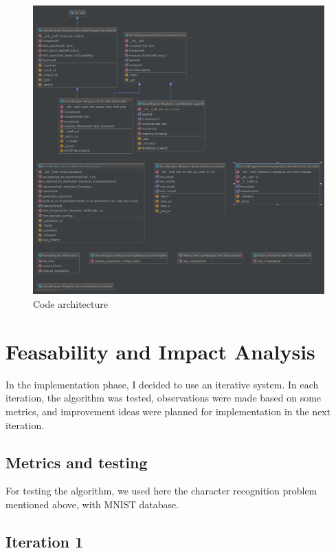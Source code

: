 \documentclass[11pt]{article}
\makeatletter
\def\maxwidth{\ifdim\Gin@nat@width>\linewidth\linewidth
    \else\Gin@nat@width\fi}
\let\Oldincludegraphics\includegraphics
\renewcommand{\includegraphics}[1]{\Oldincludegraphics[width=.8\maxwidth]{#1}}
\makeatother
\begin{document}
\begin{figure}
\centering
\includegraphics{gfx/Architecture.png}
\caption{Code architecture}
\end{figure}

    \hypertarget{feasability-and-impact-analysis}{%
\section{Feasability and Impact
Analysis}\label{feasability-and-impact-analysis}}

In the implementation phase, I decided to use an iterative system. In
each iteration, the algorithm was tested, observations were made based
on some metrics, and improvement ideas were planned for implementation
in the next iteration.

    \hypertarget{metrics-and-testing}{%
\subsection{Metrics and testing}\label{metrics-and-testing}}

For testing the algorithm, we used here the character recognition
problem mentioned above, with MNIST database.

    \hypertarget{iteration-1}{%
\subsection*{Iteration 1}\label{iteration-1}}
\end{document}
